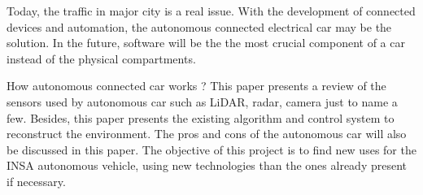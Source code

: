 
Today, the traffic in major city is a real issue. With the development of connected devices and automation, the autonomous connected electrical car may be the solution. In the future, software will be the the most crucial component of a car instead of the physical compartments.
\smallskip \smallskip


How autonomous connected car works ? This paper presents a review of the sensors used by autonomous car such as LiDAR, radar, camera just to name a few. Besides, this paper presents the existing algorithm and control system to reconstruct the environment. The pros and cons of the autonomous car will also be discussed in this paper. The objective of this project is to find new uses for the INSA autonomous vehicle, using new technologies than the ones already present if necessary.